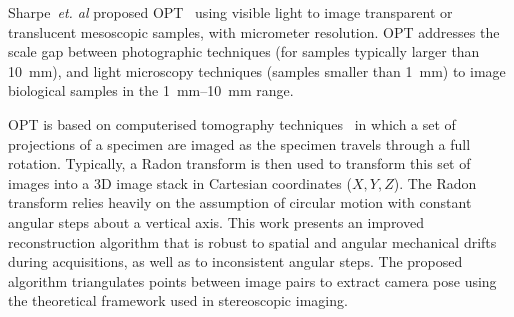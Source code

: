 \documentclass{osa-article}
\begin{document}
Sharpe~\emph{et. al} proposed OPT~\cite{sharpeOpticalProjectionTomography2002}
using visible light to image transparent or translucent mesoscopic samples, with micrometer resolution.
OPT addresses the scale gap between photographic techniques (for samples typically larger than \SI{10}{\milli\meter}), and light microscopy techniques (samples smaller than \SI{1}{\milli\meter}) to image biological samples in the \SIrange{1}{10}{\milli\meter} range.


OPT is based on computerised tomography techniques~\cite{kakPrinciplesComputerizedTomographic2001} in which a set of projections of a specimen are imaged as the specimen travels through a full rotation.
Typically, a Radon transform is then used to transform this set of images into a 3D image stack in Cartesian coordinates (\(X,Y,Z\)).
The Radon transform relies heavily on the assumption of circular motion with constant angular steps about a vertical axis.
This work presents an improved reconstruction algorithm that is robust to spatial and angular mechanical drifts during acquisitions, as well as to inconsistent angular steps.
The proposed algorithm triangulates points between image pairs to extract camera pose using the theoretical framework used in stereoscopic imaging. %

%
\end{document}
